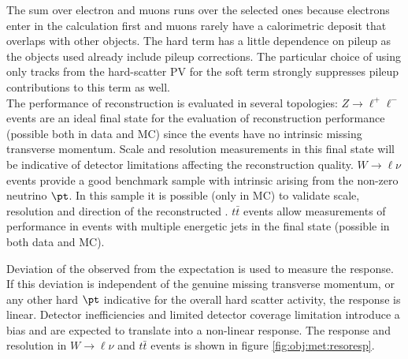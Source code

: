 The sum over electron and muons runs over the selected ones because electrons enter in the calculation first and muons rarely have a calorimetric deposit that overlaps with other objects. The hard term has a little dependence on pileup as the objects used already include pileup corrections. The particular choice of using only tracks from the hard-scatter PV for the soft term strongly suppresses pileup contributions to this term as well.\\

The performance of \MET reconstruction is evaluated in several topologies:
\bi
\ib $Z\to \ell^{+}\ell^{-}$ events are an ideal final state for the evaluation of \MET reconstruction performance (possible both in data and MC) since the events have no intrinsic missing transverse momentum. Scale and resolution measurements in this final state will be indicative of detector limitations affecting the reconstruction quality.
\ib $W\to \ell \nu$ events provide a good benchmark sample with intrinsic \MET arising from the non-zero neutrino $\pt$. In this sample it is possible (only in MC) to validate scale, resolution and direction of the reconstructed \MET.
\ib $t\bar{t}$ events allow measurements of \MET performance in events with multiple energetic jets in the final state (possible in both data and MC).
\ei

Deviation of the observed \MET from the expectation is used to measure the \MET response. If this deviation is independent of the genuine missing transverse momentum, or any other hard $\pt$ indicative for the overall hard scatter activity, the \MET response is linear. Detector inefficiencies and limited detector coverage limitation introduce a bias and are expected to translate into a non-linear response. The \MET response and resolution in $W\to \ell \nu$ and $t\bar{t}$ events is shown in figure \ref{fig:obj:met:resoresp}.

